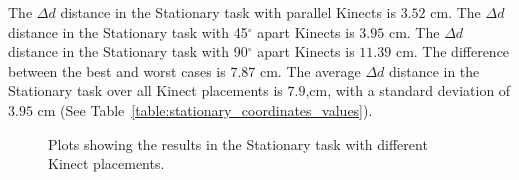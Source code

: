 The $\Delta d$ distance in the Stationary task with parallel Kinects is $3.52$ cm. The $\Delta d$ distance in the Stationary task with 45$^{\circ}$ apart Kinects is $3.95$ cm. The $\Delta d$ distance in the Stationary task with 90$^{\circ}$ apart Kinects is $11.39$ cm. The difference between the best and worst cases is $7.87$ cm. The average $\Delta d$ distance in the Stationary task over all Kinect placements is $7.9$,cm, with a standard deviation of $3.95$ cm (See Table~\ref{table:stationary_coordinates_values}).

\begin{figure}[!h]
  \centering


  \caption{Plots showing the results in the Stationary task with different Kinect placements.}

  \label{fig:stationary_coordinates_joints}
\end{figure}

